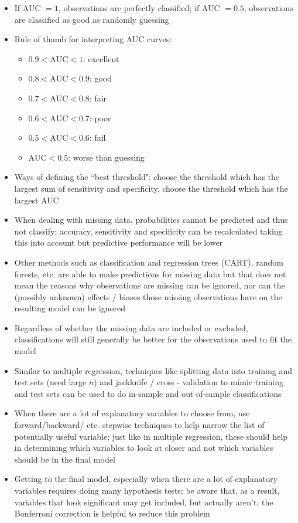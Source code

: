 \documentclass[12pt]{article}
\begin{document}
\begin{itemize}
\item If AUC $=1$, observations are perfectly classified; if AUC $=0.5$, observations are classified as good as randomly guessing 
\item Rule of thumb for interpreting AUC curves: \begin{itemize} 
\item $0.9 < \text{AUC} < 1$: excellent 
\item $0.8 < \text{AUC}  < 0.9$: good 
\item $0.7 < \text{AUC}  < 0.8$: fair
\item $0.6 < \text{AUC}  < 0.7$: poor 
\item $0.5 < \text{AUC}  < 0.6$: fail 
\item $\text{AUC}  < 0.5$: worse than guessing \end{itemize} 
\item Ways of defining the ``best threshold": choose the threshold which has the largest sum of sensitivity and specificity, choose the threshold which has the largest AUC
\item When dealing with missing data, probabilities cannot be predicted and thus not classify; accuracy, sensitivity and specificity can be recalculated taking this into account but predictive performance will be lower
\item Other methods such as classification and regression trees (CART), random forests, etc. are able to make predictions for missing data but that does not mean the reasons why observations are missing can be ignored, nor can the (possibly unknown) effects / biases those missing observations have on the resulting model can be ignored 
\item Regardless of whether the missing data are included or excluded, classifications will still generally be better for the observations used to fit the model
\item Similar to multiple regression, techniques like splitting data into training and test sets (need large $n$) and jackknife / cross - validation to mimic training and test sets can be used to do in-sample and out-of-sample classifications 
\item When there are a lot of explanatory variables to choose from, use forward/backward/ etc. stepwise techniques to help narrow the list of potentially useful variable; just like in multiple regression, these should help in determining which variables to look at closer and not which variables should be in the final model
\item Getting to the final model, especially when there are a lot of explanatory variables requires doing many hypothesis tests; be aware that, as a result, variables that look significant may get included, but actually aren't; the Bonferroni correction is helpful to reduce this problem
\end{itemize}
\end{document}

